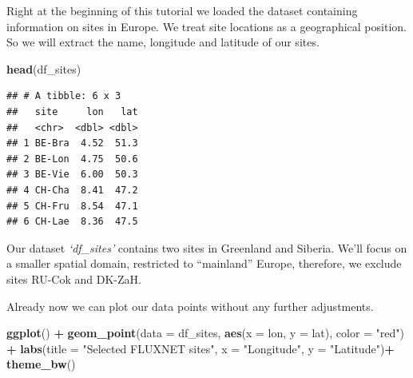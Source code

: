 \documentclass[
]{book}
\newenvironment{Shaded}{\begin{snugshade}}{\end{snugshade}}
\newcommand{\DataTypeTok}[1]{\textcolor[rgb]{0.13,0.29,0.53}{#1}}
\newcommand{\KeywordTok}[1]{\textcolor[rgb]{0.13,0.29,0.53}{\textbf{#1}}}
\newcommand{\NormalTok}[1]{#1}
\newcommand{\OperatorTok}[1]{\textcolor[rgb]{0.81,0.36,0.00}{\textbf{#1}}}
\newcommand{\StringTok}[1]{\textcolor[rgb]{0.31,0.60,0.02}{#1}}
\begin{document}
Right at the beginning of this tutorial we loaded the dataset containing information on sites in Europe. We treat site locations as a geographical position. So we will extract the name, longitude and latitude of our sites.

\begin{Shaded}
\begin{Highlighting}[]
\KeywordTok{head}\NormalTok{(df_sites)}
\end{Highlighting}
\end{Shaded}

\begin{verbatim}
## # A tibble: 6 x 3
##   site     lon   lat
##   <chr>  <dbl> <dbl>
## 1 BE-Bra  4.52  51.3
## 2 BE-Lon  4.75  50.6
## 3 BE-Vie  6.00  50.3
## 4 CH-Cha  8.41  47.2
## 5 CH-Fru  8.54  47.1
## 6 CH-Lae  8.36  47.5
\end{verbatim}

Our dataset \emph{`df\_sites'} contains two sites in Greenland and Siberia. We'll focus on a smaller spatial domain, restricted to ``mainland'' Europe, therefore, we exclude sites RU-Cok and DK-ZaH.

\begin{Shaded}
\end{Shaded}

Already now we can plot our data points without any further adjustments.

\begin{Shaded}
\begin{Highlighting}[]
\KeywordTok{ggplot}\NormalTok{() }\OperatorTok{+}
\StringTok{  }\KeywordTok{geom_point}\NormalTok{(}\DataTypeTok{data =}\NormalTok{ df_sites, }\KeywordTok{aes}\NormalTok{(}\DataTypeTok{x =}\NormalTok{ lon, }\DataTypeTok{y =}\NormalTok{ lat), }\DataTypeTok{color =} \StringTok{"red"}\NormalTok{) }\OperatorTok{+}
\StringTok{  }\KeywordTok{labs}\NormalTok{(}\DataTypeTok{title =} \StringTok{"Selected FLUXNET sites"}\NormalTok{, }\DataTypeTok{x =} \StringTok{"Longitude"}\NormalTok{, }\DataTypeTok{y =} \StringTok{"Latitude"}\NormalTok{)}\OperatorTok{+}
\StringTok{  }\KeywordTok{theme_bw}\NormalTok{()}
\end{Highlighting}
\end{Shaded}
\end{document}
